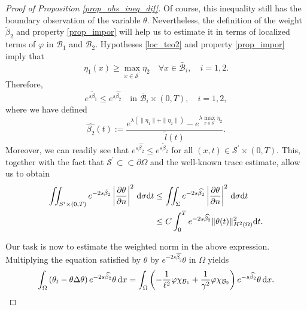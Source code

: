\documentclass{aims}
\theoremstyle{definition}
\newcommand\csin[1]{\chi_{#1}}
\def\dx{\,\textnormal{d}x}
\def\dt{\textnormal{d}t}
\def\d{\,\textnormal{d}}
\begin{document}
\begin{proof}[Proof of Proposition \ref{prop_obs_ineq_dif}]
 Of course, this inequality still has the boundary observation of the variable $\theta$. Nevertheless, the definition of the weight $\tilde\beta_2$ and property \eqref{prop_impor} will help us to estimate it in terms of localized terms of $\varphi$ in $\mathcal B_1$ and $\mathcal B_2$. Hypotheses \eqref{loc_teo2} and property \eqref{prop_impor} imply that
 \begin{equation*}
 \eta_1(x) \geq \max_{x\in \mathcal S^\prime}\eta_2 \quad \forall  x\in\bar{\mathcal B}_i, \quad i=1,2.
 \end{equation*}
 Therefore,
 \begin{equation}\label{rel_eta1_eta2}
 e^{s\tilde\beta_1}\leq e^{s\widehat{\beta_2}} \quad\text{in } \bar{\mathcal B}_i\times(0,T), \quad i=1,2,
 \end{equation}
 where we have defined
 \begin{equation*}
 \widehat{\beta_2}(t):=\frac{e^{\lambda(\|\eta_1\|+\|\eta_2\|)}-e^{{\lambda}\max_{x\in\mathcal S^\prime}\eta_2}}{\widetilde{l}(t)}.
 \end{equation*}
Moreover, we can readily see that $e^{s\widehat{\beta_2}}\leq e^{s\tilde\beta_2}$ for all $(x,t)\in \mathcal S^\prime\times(0,T)$. This, together with the fact that $\mathcal S^\prime\subset\subset\partial \Omega$ and the well-known trace estimate, allow us to obtain 
%
\begin{align}\notag 
\iint_{S^{\prime}\times(0,T)}e^{-2s\tilde\beta_2}\left|\frac{\partial \theta}{\partial n}\right|^2\d\sigma\dt &\leq \iint_{\Sigma}e^{-2s\widehat{\beta_2}}\left|\frac{\partial \theta}{\partial n}\right|^2\d\sigma\dt \\ \label{est_local_theta}
&\leq C\int_{0}^{T}e^{-2s\widehat{\beta_2}}\|\theta(t)\|_{H^2(\Omega)}^2\dt.
\end{align}

Our task is now to estimate the weighted norm in the above expression. Multiplying the equation satisfied by $\theta$ by $e^{-2s\widehat{\beta_2}}\theta$ in $\Omega$ yields
%
\begin{equation*}\int_{\Omega}\left(\theta_t-\theta \Delta \theta\right) e^{-2s\widehat{\beta_2}}\theta \dx=\int_{\Omega}\left(-\frac{1}{\ell^2}\varphi\csin{\mathcal B_1}+\frac{1}{\gamma^2}\varphi \csin{\mathcal B_2}\right)e^{-s\widehat{\beta_2}}\theta\dx.\end{equation*}


\end{proof}
\end{document}
